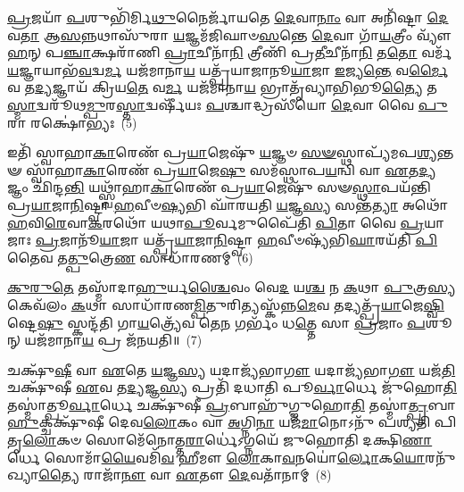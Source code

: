 \-\ul{𑌪𑍍𑌰}\-𑌜𑌯𑌾᳴ \ul{𑌪}\-𑌶𑍁𑌭𑌿᳴𑌰𑍍𑌮𑌿\-\ul{𑌥𑍁}\-𑌨𑍈𑌰𑍍𑌜𑌾᳴𑌯𑌤𑍇 \ul{𑌦𑍇}\-𑌵𑌾\-\ul{𑌨𑌾𑌂} 𑌵𑌾 𑌅𑌨𑌿᳴𑌷𑍍𑌟𑌾 \ul{𑌦𑍇}\-𑌵\-\ul{𑌤𑌾} 𑌆\-\ul{𑌸}\-𑌨𑍍𑌨𑌥𑌾𑌸𑍁᳴𑌰𑌾 \ul{𑌯}\-𑌜𑍍𑌞𑌮᳴𑌜𑌿𑌘𑌾𑍞\-\ul{𑌸}\-𑌨𑍍𑌤𑍇 \ul{𑌦𑍇}\-𑌵𑌾 𑌗𑌾᳴\-\ul{𑌯}\-𑌤𑍍𑌰𑍀𑌂 𑌵𑍍𑌯𑍗᳴\-\ul{𑌹}\-𑌨𑍍 𑌪\-\ul{𑌞𑍍𑌚𑌾}\-𑌕𑍍𑌷𑌰𑌾᳴𑌣𑌿 \ul{𑌪𑍍𑌰𑌾}\-𑌚𑍀𑌨𑌾᳴\-\ul{𑌨𑌿} 𑌤𑍍𑌰𑍀𑌣𑌿᳴ 𑌪𑍍𑌰\-\ul{𑌤𑍀}\-𑌚𑍀𑌨𑌾᳴\-\ul{𑌨𑌿} 𑌤\-\ul{𑌤𑍋} 𑌵𑌰𑍍𑌮᳴ \ul{𑌯}\-𑌜𑍍𑌞𑌾𑌯𑌾𑌭᳴\-\ul{𑌵}\-𑌦𑍍𑌵\-\ul{𑌰𑍍𑌮} 𑌯𑌜᳴𑌮𑌾𑌨𑌾\-\ul{𑌯} 𑌯𑌤𑍍𑌪𑍍𑌰᳴𑌯𑌾𑌜𑌾𑌨𑍂\-\ul{𑌯𑌾}\-𑌜𑌾 \ul{𑌇}\-𑌜𑍍𑌯\-\ul{𑌨𑍍𑌤𑍇} 𑌵\-\ul{𑌰𑍍𑌮𑍈}\-𑌵 𑌤\-\ul{𑌦𑍍𑌯}\-𑌜𑍍𑌞𑌾𑌯᳴ 𑌕𑍍𑌰𑌿𑌯\-\ul{𑌤𑍇} 𑌵\-\ul{𑌰𑍍𑌮} 𑌯𑌜᳴𑌮𑌾𑌨𑌾\-\ul{𑌯} 𑌭𑍍𑌰𑌾𑌤𑍃᳴𑌵𑍍𑌯𑌾𑌭𑌿𑌭𑍂\-\ul{𑌤𑍍𑌯𑍈} 𑌤\-\ul{𑌸𑍍𑌮𑌾}\-𑌦𑍍𑌵𑌰𑍂᳴𑌥\-\ul{𑌮𑍍𑌪𑍁}\-𑌰\-\ul{𑌸𑍍𑌤𑌾}\-𑌦𑍍𑌵𑌰𑍍\mbox{}𑌷𑍀᳴𑌯𑌃 \ul{𑌪}\-𑌶𑍍𑌚𑌾𑌦𑍍𑌧𑍍𑌰𑌸𑍀᳴𑌯𑍋 \ul{𑌦𑍇}\-𑌵𑌾 𑌵𑍈 \ul{𑌪𑍁}\-𑌰𑌾 𑌰𑌕𑍍𑌷𑍋॑𑌭𑍍𑌯𑌃~(5)

𑌇𑌤𑌿᳴ 𑌸𑍍𑌵𑌾𑌹𑌾\-\ul{𑌕𑌾}\-𑌰𑍇𑌣᳴ 𑌪𑍍𑌰\-\ul{𑌯𑌾}\-𑌜𑍇𑌷𑍁᳴ \ul{𑌯}\-𑌜𑍍𑌞𑍞 \ul{𑌸}\-\-\ul{𑍟}\-𑌸𑍍𑌥𑌾𑌪𑍍𑌯᳴𑌮𑌪\-\ul{𑌶𑍍𑌯}\-𑌨𑍍𑌤𑍟 𑌸𑍍𑌵𑌾᳴𑌹𑌾\-\ul{𑌕𑌾}\-𑌰𑍇𑌣᳴ 𑌪𑍍𑌰\-\ul{𑌯𑌾}\-𑌜𑍇\-\ul{𑌷𑍁} 𑌸𑌮᳴𑌸𑍍𑌥𑌾𑌪\-\ul{𑌯}\-𑌨𑍍𑌵𑌿 𑌵𑌾 \ul{𑌏}\-𑌤\-\ul{𑌦𑍍𑌯}\-𑌜𑍍𑌞𑌂 𑌛𑌿᳴𑌨𑍍𑌦\-\ul{𑌨𑍍𑌤𑌿} 𑌯𑌥𑍍𑌸𑍍𑌵𑌾᳴𑌹𑌾\-\ul{𑌕𑌾}\-𑌰𑍇𑌣᳴ 𑌪𑍍𑌰\-\ul{𑌯𑌾}\-𑌜𑍇𑌷𑍁᳴ 𑌸𑍟\-\ul{𑌸𑍍𑌥𑌾}\-𑌪𑌯᳴𑌨𑍍𑌤𑌿 𑌪𑍍𑌰\-\ul{𑌯𑌾}\-𑌜𑌾\-\ul{𑌨𑌿}\-𑌷𑍍𑌟𑍍𑌵𑌾 \ul{𑌹}\-𑌵𑍀𑍞\-\ul{𑌷𑍍𑌯}\-𑌭𑌿 𑌘𑌾᳴𑌰𑌯𑌤𑌿 \ul{𑌯}\-𑌜𑍍𑌞\-\ul{𑌸𑍍𑌯} 𑌸𑌨𑍍𑌤᳴\-\ul{𑌤𑍍𑌯𑌾} 𑌅𑌥𑍋᳴ \ul{𑌹}\-𑌵𑌿\-\ul{𑌰𑍇}\-𑌵𑌾\-\ul{𑌕}\-𑌰𑌥𑍋᳴ 𑌯𑌥𑌾\-\ul{𑌪𑍂}\-𑌰𑍍𑌵𑌮𑍁𑌪𑍈᳴𑌤𑌿 \ul{𑌪𑌿}\-𑌤𑌾 𑌵𑍈 \ul{𑌪𑍍𑌰}\-𑌯𑌾𑌜𑌾𑌃 \ul{𑌪𑍍𑌰}\-𑌜𑌾𑌨𑍂᳴\-\ul{𑌯𑌾}\-𑌜𑌾 𑌯𑌤𑍍𑌪𑍍𑌰᳴\-\ul{𑌯𑌾}\-𑌜𑌾\-\ul{𑌨𑌿}\-𑌷𑍍𑌟𑍍𑌵𑌾 \ul{𑌹}\-𑌵𑍀𑍞𑌷𑍍𑌯᳴𑌭𑌿\-\ul{𑌘𑌾}\-𑌰𑌯᳴𑌤𑌿 \ul{𑌪𑌿}\-𑌤𑍈𑌵 𑌤\-\ul{𑌤𑍍𑌪𑍁}\-𑌤𑍍𑌰𑍇\-\ul{𑌣} 𑌸𑌾𑌧𑌾᳴𑌰𑌣𑌮𑍍~(6)

\-\ul{𑌕𑍁}\-\-\ul{𑌰𑍁}\-\-\ul{𑌤𑍇} 𑌤𑌸𑍍𑌮𑌾᳴𑌦𑌾\-\ul{𑌹𑍁}\-𑌰𑍍𑌯\-\ul{𑌶𑍍𑌚𑍈}\-𑌵𑌂 𑌵𑍇\-\ul{𑌦} 𑌯\-\ul{𑌶𑍍𑌚} 𑌨 \ul{𑌕}\-𑌥𑌾 \ul{𑌪𑍁}\-𑌤𑍍𑌰\-\ul{𑌸𑍍𑌯} 𑌕𑍇𑌵᳴𑌲𑌂 \ul{𑌕}\-𑌥𑌾 𑌸𑌾𑌧𑌾᳴𑌰𑌣\-\ul{𑌮𑍍𑌪𑌿}\-𑌤𑍁𑌰𑌿𑌤𑍍𑌯𑌸𑍍𑌕᳴𑌨𑍍𑌨\-\ul{𑌮𑍇}\-𑌵 𑌤𑌦𑍍𑌯𑌤𑍍𑌪𑍍𑌰᳴\-\ul{𑌯𑌾}\-𑌜𑍇\-\ul{𑌷𑍍𑌵𑌿}\-𑌷𑍍𑌟𑍇\-\ul{𑌷𑍁} 𑌸𑍍𑌕𑌨𑍍𑌦᳴𑌤𑌿 𑌗𑌾\-\ul{𑌯}\-𑌤𑍍𑌰𑍍𑌯𑍇᳴𑌵 𑌤𑍇\-\ul{𑌨} 𑌗𑌰𑍍𑌭𑌂᳴ 𑌧\-\ul{𑌤𑍍𑌤𑍇} 𑌸𑌾 \ul{𑌪𑍍𑌰}\-𑌜𑌾𑌂 \ul{𑌪}\-𑌶𑍂𑌨𑍍 𑌯𑌜᳴𑌮𑌾𑌨𑌾\-\ul{𑌯} 𑌪𑍍𑌰 𑌜᳴𑌨𑌯𑌤𑌿॥~(7)

{}%

𑌚𑌕𑍍𑌷𑍁᳴\-\ul{𑌷𑍀} 𑌵𑌾 \ul{𑌏}\-𑌤𑍇 \ul{𑌯}\-𑌜𑍍𑌞\-\ul{𑌸𑍍𑌯} 𑌯𑌦𑌾𑌜𑍍𑌯᳴𑌭𑌾\-\ul{𑌗𑍗} 𑌯𑌦𑌾𑌜𑍍𑌯᳴𑌭𑌾\-\ul{𑌗𑍗} 𑌯𑌜᳴\-\ul{𑌤𑌿} 𑌚𑌕𑍍𑌷𑍁᳴𑌷𑍀 \ul{𑌏}\-𑌵 𑌤\-\ul{𑌦𑍍𑌯}\-𑌜𑍍𑌞\-\ul{𑌸𑍍𑌯} 𑌪𑍍𑌰𑌤𑌿᳴ 𑌦𑌧𑌾𑌤𑌿 𑌪𑍂\-\ul{𑌰𑍍𑌵𑌾}\-𑌰𑍍𑌧𑍇 𑌜𑍁᳴𑌹𑍋\-\ul{𑌤𑌿} 𑌤𑌸𑍍𑌮𑌾॑𑌤𑍍𑌪𑍂\-\ul{𑌰𑍍𑌵𑌾}\-𑌰𑍍𑌧𑍇 𑌚𑌕𑍍𑌷𑍁᳴𑌷𑍀 \ul{𑌪𑍍𑌰}\-𑌬𑌾𑌹𑍁᳴𑌗𑍍𑌜𑍁𑌹𑍋\-\ul{𑌤𑌿} 𑌤𑌸𑍍𑌮𑌾॑\-\ul{𑌤𑍍𑌪𑍍𑌰}\-𑌬𑌾\-\ul{𑌹𑍁}\-𑌕𑍍𑌚𑌕𑍍𑌷𑍁᳴𑌷𑍀 𑌦𑍇𑌵\-\ul{𑌲𑍋}\-𑌕𑌂 𑌵𑌾 \ul{𑌅}\-𑌗𑍍𑌨𑌿\-\ul{𑌨𑌾} 𑌯𑌜᳴\-\ul{𑌮𑌾}\-𑌨𑍋\-𑌽𑌨𑍁᳴ 𑌪𑌶𑍍𑌯𑌤𑌿 𑌪𑌿𑌤𑍃\-\ul{𑌲𑍋}\-𑌕𑍞 𑌸𑍋𑌮𑍇᳴𑌨𑍋𑌤𑍍𑌤\-\ul{𑌰𑌾}\-𑌰𑍍𑌧𑍇॑\-𑌽𑌗𑍍𑌨𑌯𑍇᳴ 𑌜𑍁𑌹𑍋𑌤𑌿 𑌦𑌕𑍍𑌷𑌿\-\ul{𑌣𑌾}\-𑌰𑍍𑌧𑍇 𑌸𑍋𑌮𑌾᳴\-\ul{𑌯𑍈}\-𑌵𑌮𑌿᳴\-\ul{𑌵} 𑌹𑍀𑌮𑍗 \ul{𑌲𑍋}\-𑌕𑌾\-\ul{𑌵}\-𑌨𑌯𑍋॑\-\ul{𑌰𑍍𑌲𑍋}\-𑌕\-\ul{𑌯𑍋}\-𑌰𑌨𑍁᳴𑌖𑍍𑌯𑌾\-\ul{𑌤𑍍𑌯𑍈} 𑌰𑌾𑌜𑌾᳴\-\ul{𑌨𑍗} 𑌵𑌾 \ul{𑌏}\-𑌤𑍗 \ul{𑌦𑍇}\-𑌵𑌤𑌾᳴𑌨𑌾𑌮𑍍~(8)

